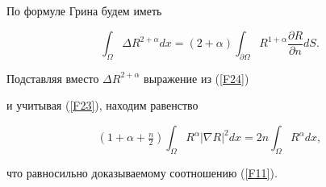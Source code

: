 По формуле Грина будем иметь


\begin{equation} \label{F25}


\int_\Omega \Delta R^{2+\alpha}dx=


(2+\alpha)\int_{\partial\Omega}R^{1+\alpha}\frac{\partial R}{\partial n}dS.


\end{equation}


Подставляя вместо $\Delta R^{2+\alpha}$ выражение из (\ref{F24}) 


и учитывая (\ref{F23}), находим равенство


$$


(1+\alpha +\tfrac{n}{2})\int_\Omega R^\alpha |\nabla R|^2 dx=


2n\int_\Omega R^\alpha dx,


$$


что равносильно доказываемому соотношению (\ref{F11}).





